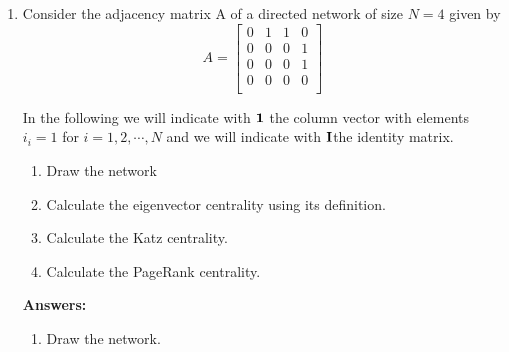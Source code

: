 \documentclass{amsart}
\theoremstyle{definition}
\theoremstyle{remark}
\numberwithin{equation}{section}
\begin{document}
\clearpage
\begin{enumerate}


\item Consider the adjacency matrix A of a directed network of size $N = 4$ given by \vspace{0.2cm}
\begin{equation*}
{A}  = \left\lbrack\begin{array}{cccc}
0 & 1 & 1 & 0 \\
0 & 0 & 0 & 1 \\
0 & 0 & 0 & 1 \\
0 & 0 & 0 & 0 \\
\end{array}\right\rbrack
\end{equation*}

\vspace{0.2cm}
In the following we will indicate with ${\bf 1}$ the column vector with elements $i_i = 1$ for $i = 1, 2, \cdots, N$ and we will indicate with ${\bf I}$the identity matrix. \vspace{0.2cm}
\begin{enumerate}
\item Draw the network
\item Calculate the eigenvector centrality using its definition.
\item Calculate the Katz centrality.
\item Calculate the PageRank centrality. 
\end{enumerate}
\vspace{1cm}

\textbf{Answers:}

\begin{enumerate}
\item Draw the network. \vspace{0.2cm}



\end{enumerate}
\end{enumerate}
\end{document}
